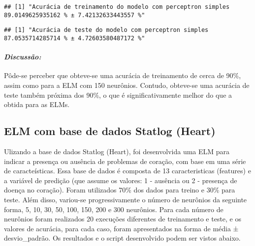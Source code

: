 \documentclass[
]{article}
\newenvironment{Shaded}{\begin{snugshade}}{\end{snugshade}}
\newcommand{\KeywordTok}[1]{\textcolor[rgb]{0.13,0.29,0.53}{\textbf{#1}}}
\newcommand{\NormalTok}[1]{#1}
\newcommand{\StringTok}[1]{\textcolor[rgb]{0.31,0.60,0.02}{#1}}
\begin{document}
\begin{verbatim}
## [1] "Acurácia de treinamento do modelo com perceptron simples 89.0149625935162 % ± 7.42132633443557 %"
\end{verbatim}

\begin{Shaded}
\end{Shaded}

\begin{verbatim}
## [1] "Acurácia de teste do modelo com perceptron simples 87.0535714285714 % ± 4.72603580487172 %"
\end{verbatim}

\hypertarget{discussuxe3o-1}{%
\paragraph{\texorpdfstring{\textbf{\emph{Discussão:}}}{Discussão:}}\label{discussuxe3o-1}}

Pôde-se perceber que obteve-se uma acurácia de treinamento de cerca de
90\%, assim como para a ELM com 150 neurônios. Contudo, obteve-se uma
acurácia de teste também próxima dos 90\%, o que é significativamente
melhor do que a obtida para as ELMs.

\hypertarget{elm-com-base-de-dados-statlog-heart}{%
\subsection{ELM com base de dados Statlog
(Heart)}\label{elm-com-base-de-dados-statlog-heart}}

Ulizando a base de dados Statlog (Heart), foi desenvolvida uma ELM para
indicar a presença ou ausência de problemas de coração, com base em uma
série de caracteísticas. Essa base de dados é composta de 13
caracteristicas (features) e a variável de predição (que assume os
valores: 1 - ausência ou 2 - presença de doença no coração). Foram
utilizados 70\% dos dados para treino e 30\% para teste. Além disso,
variou-se progressivamente o número de neurônios da seguinte forma, 5,
10, 30, 50, 100, 150, 200 e 300 neurônios. Para cada número de neurônios
foram realizados 20 execuções diferentes de treinamento e teste, e os
valores de acurácia, para cada caso, foram apresentados na forma de
média ± desvio\_padrão. Os resultados e o script desenvolvido podem ser
vistos abaixo.
\end{document}
